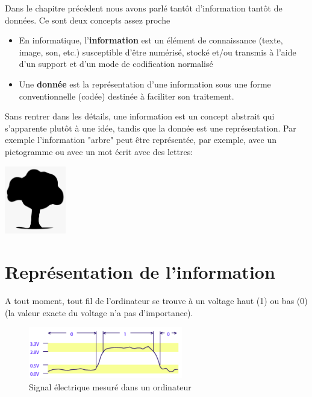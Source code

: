 \begin{eclairage}
	Dans le chapitre précédent nous avons parlé tantôt d'information tantôt de données. Ce sont deux concepts assez proche 
	\begin{itemize}
		\item En informatique, l’\textbf{information} est un élément de connaissance (texte, image, son, etc.) susceptible d’être numérisé, stocké et/ou transmis à l’aide d’un support et d’un mode de codification normalisé
		\item Une \textbf{donnée} est la représentation d’une information sous une forme
		conventionnelle (codée) destinée à faciliter son traitement.
	\end{itemize}
	Sans rentrer dans les détails, une information est un concept abstrait qui s'apparente plutôt à une idée, tandis que la donnée est une représentation. Par exemple l'information "arbre" peut être représentée, par exemple, avec un pictogramme ou avec un mot écrit avec des lettres:
	\begin{center}
		\includegraphics[trim=0 0 0 20,width=0.2\textwidth]{Images/intro/arbre.png} 
		\hspace{2cm}
	\end{center}
\end{eclairage}	

\section{Représentation de l'information}
\label{codageNombre} 
A tout moment, tout fil de l’ordinateur se trouve à un voltage haut (1) ou bas (0) (la valeur exacte du voltage n’a pas d’importance).
\begin{figure}[!h]
	\centering
	\includegraphics[trim=0 0 0 20,width=0.6\textwidth]{Images/intro/signaux.png} 
	\caption{Signal électrique mesuré dans un ordinateur}
\end{figure}
	
